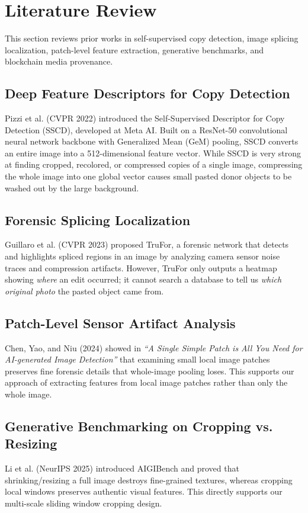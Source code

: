 \documentclass[12pt,a4paper]{article}
\begin{document}
\section{Literature Review}
This section reviews prior works in self-supervised copy detection, image splicing localization, patch-level feature extraction, generative benchmarks, and blockchain media provenance.

\subsection{Deep Feature Descriptors for Copy Detection}
Pizzi et al. (CVPR 2022) \cite{sscd} introduced the Self-Supervised Descriptor for Copy Detection (SSCD), developed at Meta AI. Built on a ResNet-50 convolutional neural network backbone with Generalized Mean (GeM) pooling, SSCD converts an entire image into a 512-dimensional feature vector. While SSCD is very strong at finding cropped, recolored, or compressed copies of a single image, compressing the whole image into one global vector causes small pasted donor objects to be washed out by the large background.

\subsection{Forensic Splicing Localization}
Guillaro et al. (CVPR 2023) \cite{trufor} proposed TruFor, a forensic network that detects and highlights spliced regions in an image by analyzing camera sensor noise traces \cite{noiseprint} and compression artifacts. However, TruFor only outputs a heatmap showing \textit{where} an edit occurred; it cannot search a database to tell us \textit{which original photo} the pasted object came from.

\subsection{Patch-Level Sensor Artifact Analysis}
Chen, Yao, and Niu (2024) \cite{singlepatch} showed in \textit{``A Single Simple Patch is All You Need for AI-generated Image Detection''} that examining small local image patches preserves fine forensic details that whole-image pooling loses. This supports our approach of extracting features from local image patches rather than only the whole image.

\subsection{Generative Benchmarking on Cropping vs. Resizing}
Li et al. (NeurIPS 2025) \cite{aigibench} introduced AIGIBench and proved that shrinking/resizing a full image destroys fine-grained textures, whereas cropping local windows preserves authentic visual features. This directly supports our multi-scale sliding window cropping design.
\end{document}
